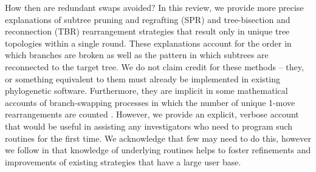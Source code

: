 \documentclass[12pt,letterpaper]{article}
\begin{document}
How then are redundant swaps avoided? %
In this review, we provide more precise explanations of subtree pruning and regrafting (SPR) and tree-bisection and reconnection (TBR) rearrangement strategies that result only in unique tree topologies within a single round. 
These explanations account for the order in which branches are broken as well as the pattern in which subtrees are reconnected to the target tree.
We do not claim credit for these methods -- they, or something equivalent to them must already be implemented in existing phylogenetic software.
Furthermore, they are implicit in some mathematical accounts of branch-swapping processes in which the number of unique 1-move rearrangements are counted \citep{allen2001subtree}.%
However, we provide an explicit, verbose account that would be useful in assisting any investigators who need to program such routines for the first time. 
We acknowledge that few may need to do this, however we follow \citet{goloboff1993character} in that knowledge of underlying routines helps to foster refinements and improvements of existing strategies that have a large user base. %
\end{document}
